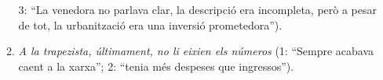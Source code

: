 \begin{enumerate}
\begin{enumerate}
    3: ``La venedora no parlava clar, la descripció era incompleta,
    però a pesar de tot, la urbanització era una inversió
    prometedora'').
  \item \emph{A la trapezista, últimament, no li eixien els números}
    (1: ``Sempre acabava caent a la xarxa''; 2: ``tenia més despeses
    que ingressos'').
  \end{enumerate}


\end{enumerate}
